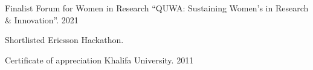 \begin{cvhonors}

  \cvhonor
    {Finalist} %
    {Forum for Women in
Research “QUWA: Sustaining Women’s in Research \& Innovation”. } %
    {} %
    {2021} %

     \cvhonor
    {Shortlisted} %
    {Ericsson Hackathon. } %
    {} %
    {} %

    

\end{cvhonors}
\begin{cvhonors}
  \cvhonor
    {Certificate of appreciation} %
    {Khalifa University. } %
    {} %
    {2011} %

\end{cvhonors}